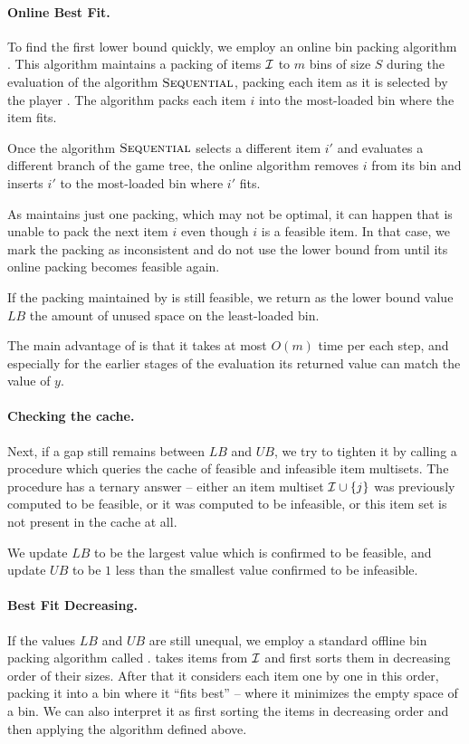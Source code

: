 \paragraph{Online Best Fit.} To find the first lower bound quickly, we
employ an online bin packing algorithm \obf. This algorithm maintains
a packing of items ${\mathcal I}$ to $m$ bins of size $S$ during the
evaluation of the algorithm $\textsc{Sequential}$, packing each item as it is
selected by the player \adversary. The algorithm \obf packs each item
$i$ into the most-loaded bin where the item fits.

Once the algorithm $\textsc{Sequential}$ selects a different item $i'$ and
evaluates a different branch of the game tree, the online algorithm
removes $i$ from its bin and inserts $i'$ to the most-loaded bin
where $i'$ fits.

As \obf maintains just one packing, which may not be optimal, it can
happen that \obf is unable to pack the next item $i$ even though $i$
is a feasible item. In that case, we mark the packing as inconsistent
and do not use the lower bound from \obf until its online packing
becomes feasible again.

If the packing maintained by \obf is still feasible, we return as the
lower bound value $LB$ the amount of unused space on the least-loaded
bin.

The main advantage of \obf is that it takes at most $O(m)$ time per
each step, and especially for the earlier stages of the evaluation its
returned value can match the value of $y$.

\paragraph{Checking the cache.} Next, if a gap still remains between
$LB$ and $UB$, we try to tighten it by calling a procedure \Query
which queries the cache of feasible and infeasible item multisets.
The procedure has a ternary answer -- either an item multiset ${\mathcal I}
\cup \{j\}$ was previously computed to be feasible, or it was computed
to be infeasible, or this item set is not present in the cache at all.

We update $LB$ to be the largest value which is confirmed to be
feasible, and update $UB$ to be $1$ less than the smallest value
confirmed to be infeasible.

\paragraph{Best Fit Decreasing.} If the values $LB$ and $UB$ are still
unequal, we employ a standard offline bin packing algorithm called
\bfd. \bfd takes items from ${\mathcal I}$ and first sorts them in decreasing
order of their sizes. After that it considers each item one by one in
this order, packing it into a bin where it ``fits best'' -- where it
minimizes the empty space of a bin. We can also interpret it as first
sorting the items in decreasing order and then applying the algorithm
\obf defined above.

